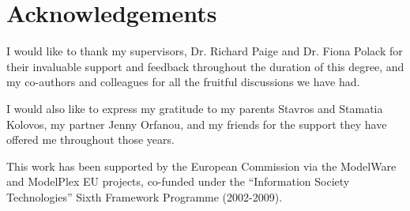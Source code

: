 \chapter*{Acknowledgements}

I would like to thank my supervisors, Dr. Richard Paige and Dr. Fiona Polack for their invaluable support and feedback throughout the duration of this degree, and my co-authors and colleagues for all the fruitful discussions we have had.

I would also like to express my gratitude to my parents Stavros and Stamatia Kolovos, my partner Jenny Orfanou, and my friends for the support they have offered me throughout those years.

This work has been supported by the European Commission via the ModelWare and ModelPlex EU projects, co-funded under the ``Information Society Technologies'' Sixth Framework Programme (2002-2009).